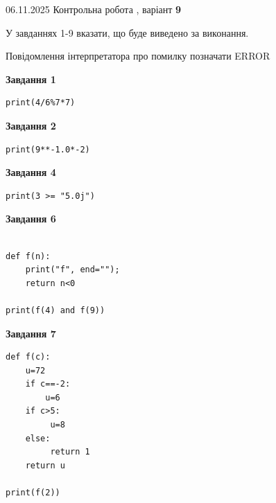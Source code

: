 \documentclass[12pt, ukrainian]{article}
\begin{document}
{\Large{06.11.2025 Контрольна робота , варіант  \No \textbf { 9 }\par}}
{
\begin {large}
У завданнях 1-9 вказати, що буде виведено за виконання.

Повідомлення інтерпретатора про помилку позначати ERROR

\begin{minipage}[t]{7.5cm}

\begin{center}
\textbf{Завдання 1}
\end{center}

\begin{verbatim}
print(4/6%7*7)
\end{verbatim}



\begin{center}
\textbf{Завдання 2}
\end{center}

\begin{verbatim}
print(9**-1.0*-2)
\end{verbatim}



\begin{center}
\textbf{Завдання 4}
\end{center}

\begin{verbatim}
print(3 >= "5.0j")
\end{verbatim}



\begin{center}
\textbf{Завдання 6}
\end{center}

\begin{verbatim}

def f(n):
    print("f", end="");
    return n<0

print(f(4) and f(9))
\end{verbatim}



\begin{center}
\textbf{Завдання 7}
\end{center}

\begin{verbatim}
def f(c):
    u=72
    if c==-2: 
        u=6
    if c>5:
         u=8
    else:
         return 1
    return u

print(f(2))
\end{verbatim}


\end{minipage}
\end{large}}
\end{document}
